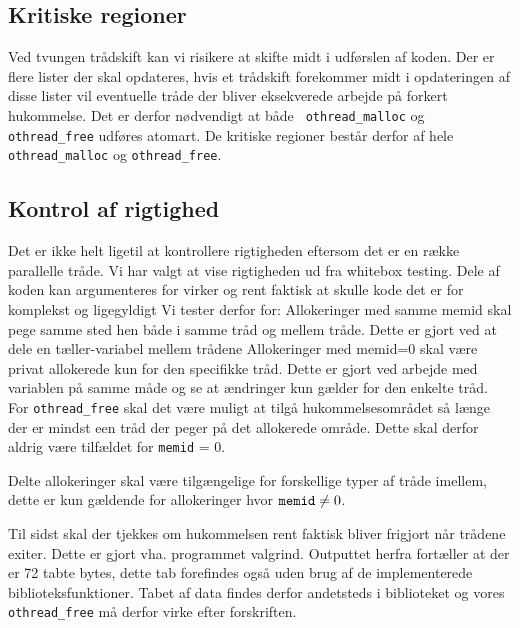 \documentclass[titlepage]{article}
\begin{document}
\subsection{Kritiske regioner}
Ved tvungen trådskift kan vi risikere at skifte midt i udførslen af koden. Der er flere lister der
skal opdateres, hvis et trådskift forekommer midt i opdateringen af disse lister vil eventuelle
tråde der bliver eksekverede arbejde på forkert hukommelse. Det er derfor nødvendigt at både {\tt
othread\_malloc} og {\tt othread\_free} udføres atomart. De kritiske regioner består derfor af hele
{\tt othread\_malloc} og {\tt othread\_free}.

\subsection{Kontrol af rigtighed}
Det er ikke helt ligetil at kontrollere rigtigheden eftersom det er en række parallelle tråde. Vi har
valgt at vise rigtigheden ud fra whitebox testing. Dele af koden kan argumenteres for virker og rent
faktisk at skulle kode det er for komplekst og ligegyldigt Vi tester derfor for:
Allokeringer med samme memid skal pege samme sted hen både i samme tråd og mellem tråde. Dette er
gjort ved at dele en tæller-variabel mellem trådene
Allokeringer med memid=0 skal være privat allokerede kun for den specifikke tråd. Dette er gjort ved
arbejde med variablen på samme måde og se at ændringer kun gælder for den enkelte tråd.
For {\tt othread\_free} skal det være muligt at tilgå hukommelsesområdet så længe der er mindst een
tråd der peger på det allokerede område. Dette skal derfor aldrig være tilfældet for {\tt memid} =
0. 

Delte allokeringer skal være tilgængelige for forskellige typer af tråde imellem, dette er kun
gældende for allokeringer hvor ${\tt memid} \neq 0$.

Til sidst skal der tjekkes om hukommelsen rent faktisk bliver frigjort når trådene exiter. Dette er
gjort vha. programmet valgrind. Outputtet herfra fortæller at der er 72 tabte bytes, dette tab
forefindes også uden brug af de implementerede biblioteksfunktioner. Tabet af data findes derfor
andetsteds i biblioteket og vores {\tt othread\_free} må derfor virke efter forskriften.
\end{document}
